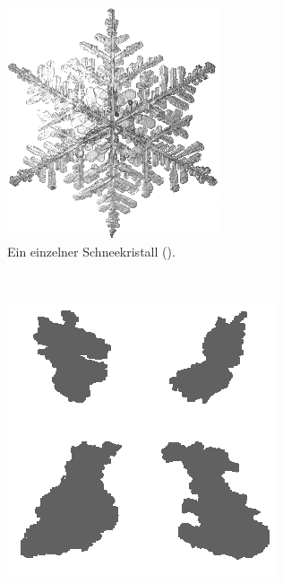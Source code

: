 \begin{figure}
\centering
    \begin{subfigure}[t]{0.45\textwidth}
            \centering
            \includegraphics[width=\textwidth]{images/single_snow_crystal}
            \caption{Ein einzelner  Schneekristall (\cite{Yanagi2011}).}
\label{fig:implementation_single_snow_crystal}
    \end{subfigure}
    ~
    \begin{subfigure}[t]{0.45\textwidth}
            \centering
            \includegraphics[width=\textwidth]{images/real_snowflakes}

\end{subfigure}
\end{figure}
